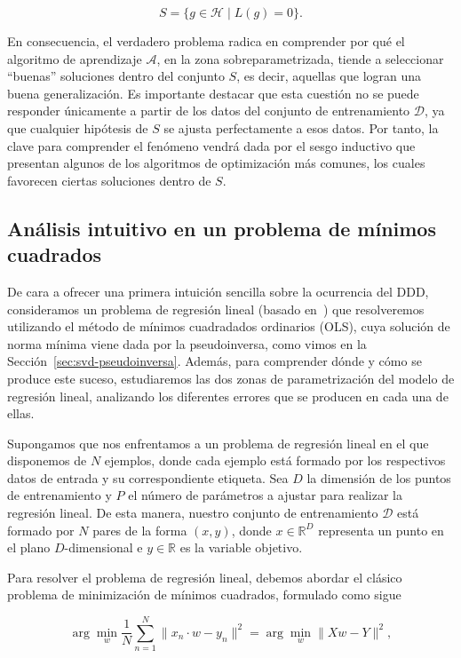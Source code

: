 \[
    S = \{ g \in \mathcal{H} \mid L(g) = 0 \}.
\]

En consecuencia, el verdadero problema radica en comprender por qué el algoritmo de aprendizaje $\mathcal{A}$, en la zona sobreparametrizada, tiende a seleccionar ``buenas'' soluciones dentro del conjunto $S$, es decir, aquellas que logran una buena generalización. Es importante destacar que esta cuestión no se puede responder únicamente a partir de los datos del conjunto de entrenamiento $\mathcal{D}$, ya que cualquier hipótesis de $S$ se ajusta perfectamente a esos datos. Por tanto, la clave para comprender el fenómeno vendrá dada por el sesgo inductivo que presentan algunos de los algoritmos de optimización más comunes, los cuales favorecen ciertas soluciones dentro de $S$.

\subsection{Análisis intuitivo en un problema de mínimos cuadrados}\label{subsec:analisis-intuitivo-minimos-cuadrados}

De cara a ofrecer una primera intuición sencilla sobre la ocurrencia del DDD, consideramos un problema de regresión lineal (basado en~\cite{Schaeffer2023}) que resolveremos utilizando el método de mínimos cuadradados ordinarios (OLS), cuya solución de norma mínima viene dada por la pseudoinversa, como vimos en la Sección~\ref{sec:svd-pseudoinversa}. Además, para comprender dónde y cómo se produce este suceso, estudiaremos las dos zonas de parametrización del modelo de regresión lineal, analizando los diferentes errores que se producen en cada una de ellas.

Supongamos que nos enfrentamos a un problema de regresión lineal en el que disponemos de $N$ ejemplos, donde cada ejemplo está formado por los respectivos datos de entrada y su correspondiente etiqueta. Sea $D$ la dimensión de los puntos de entrenamiento y $P$ el número de parámetros a ajustar para realizar la regresión lineal. De esta manera, nuestro conjunto de entrenamiento $\mathcal{D}$ está formado por $N$ pares de la forma $(x,y)$, donde $x \in \mathbb{R}^{D}$ representa un punto en el plano $D$-dimensional e $y \in \mathbb{R}$ es la variable objetivo.

Para resolver el problema de regresión lineal, debemos abordar el clásico problema de minimización de mínimos cuadrados, formulado como sigue

\begin{equation}\label{eq:minimos-cuadrados1}
    \arg\min_{w} \frac{1}{N}\sum_{n=1}^{N}\| x_n \cdot w - y_n \|^{2} = \arg\min_{w}\| Xw - Y \|^{2},
\end{equation}

